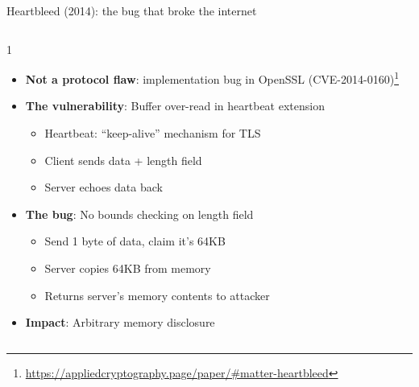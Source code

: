 \ifdefined\PRESENTATION\else\PassOptionsToClass{handout}{beamer}\fi\documentclass[aspectratio=169, lualatex]{beamer}
\begin{document}
\begin{frame}{Heartbleed (2014): the bug that broke the internet}
	\begin{columns}[c]
		\begin{column}{1\textwidth}
			\begin{itemize}
				\item \textbf{Not a protocol flaw}: implementation bug in OpenSSL (CVE-2014-0160)\footnote{\url{https://appliedcryptography.page/paper/\#matter-heartbleed}}
				\item \textbf{The vulnerability}: Buffer over-read in heartbeat extension
				      \begin{itemize}
					      \item Heartbeat: ``keep-alive'' mechanism for TLS
					      \item Client sends data + length field
					      \item Server echoes data back
				      \end{itemize}
				\item \textbf{The bug}: No bounds checking on length field
				      \begin{itemize}
					      \item Send 1 byte of data, claim it's 64KB
					      \item Server copies 64KB from memory
					      \item Returns server's memory contents to attacker
				      \end{itemize}
				\item \textbf{Impact}: Arbitrary memory disclosure
			\end{itemize}
		\end{column}
	\end{columns}
\end{frame}
\end{document}
